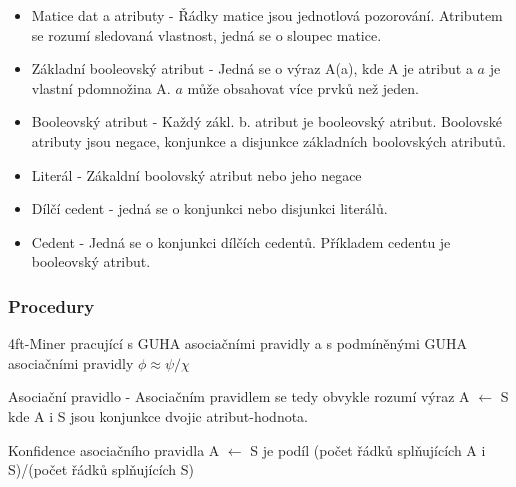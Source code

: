 \begin{itemize}
    \item Matice dat a atributy - Řádky matice jsou jednotlová pozorování. Atributem se rozumí sledovaná vlastnost, jedná se o sloupec matice.
    \item Základní booleovský atribut - Jedná se o výraz A(a), kde A je atribut a $a$ je vlastní pdomnožina A. $a$ může obsahovat více prvků než jeden.
    \item Booleovský atribut -  Každý zákl. b. atribut je booleovský atribut. Boolovské atributy jsou negace, konjunkce a disjunkce základních boolovských atributů.
    \item Literál - Zákaldní boolovský atribut nebo jeho negace
    \item Dílčí cedent - jedná se o konjunkci nebo disjunkci literálů.
    \item Cedent - Jedná se o konjunkci dílčích cedentů. Příkladem cedentu je booleovský atribut.
\end{itemize}

\subsubsection*{Procedury}

4ft-Miner pracující s GUHA asociačními pravidly a s podmíněnými GUHA asociačními pravidly $\phi \approx  \psi / \chi $

Asociační pravidlo -  Asociačním pravidlem se tedy obvykle rozumí výraz A $\leftarrow$ S kde A i S jsou konjunkce dvojic atribut-hodnota. %

Konfidence asociačního pravidla A $\leftarrow$  S je podíl (počet řádků splňujících A i S)/(počet řádků splňujících S)  %




